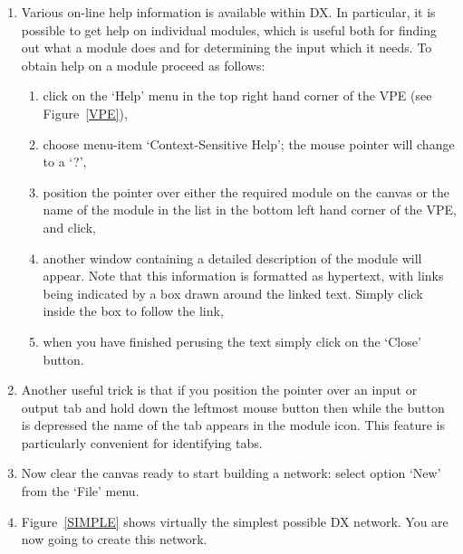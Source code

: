 \documentclass[twoside,11pt]{article}
\begin{document}
\begin{enumerate}
  \item Various on-line help information is available within DX. In
   particular, it is possible to get help on individual modules, which
   is useful both for finding out what a module does and for determining
   the input which it needs. To obtain help on a module proceed as
   follows:

  \begin{enumerate}

    \item click on the `Help' menu in the top right hand corner of
     the VPE (see Figure~\ref{VPE}),

    \item choose menu-item `Context-Sensitive Help'; the mouse pointer
     will change to a `?',

    \item position the pointer over either the required module on the
     canvas or the name of the module in the list in the bottom left
     hand corner of the VPE, and click,

    \item another window containing a detailed description of the module
     will appear. Note that this information is formatted as hypertext,
     with links being indicated by a box drawn around the linked text.
     Simply click inside the box to follow the link,

    \item when you have finished perusing the text simply click on the
     `Close' button.

  \end{enumerate}

  \item Another useful trick is that if you position the pointer over
   an input or output tab and hold down the leftmost mouse button then
   while the button is depressed the name of the tab appears in the
   module icon. This feature is particularly convenient for identifying
   tabs.

  \item Now clear the canvas ready to start building a network: select
   option `New' from the `File' menu.

  \item Figure~\ref{SIMPLE} shows virtually the simplest possible DX
   network. You are now going to create this network.

  \begin{figure}[htbp]


\end{figure}
\end{enumerate}
\end{document}

